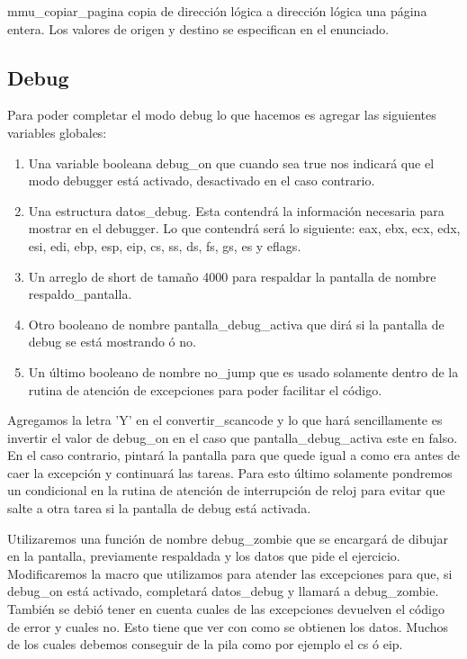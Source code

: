 \documentclass[a4paper]{article}
\begin{document}
mmu\_copiar\_pagina copia de dirección lógica a dirección lógica una página entera. Los valores de origen y destino se especifican en el enunciado.

\subsection{Debug}

Para poder completar el modo debug lo que hacemos es agregar las siguientes variables globales:
\begin{enumerate}
  \item Una variable booleana debug\_on que cuando sea true nos indicará que el modo debugger está activado, desactivado en el caso contrario.
  \item Una estructura datos\_debug. Esta contendrá la información necesaria para mostrar en el debugger. Lo que contendrá será lo siguiente: eax, ebx, ecx, edx, esi, edi, ebp, esp, eip, cs, ss, ds, fs, gs, es y eflags.
  \item Un arreglo de short de tamaño 4000 para respaldar la pantalla de nombre respaldo\_pantalla.
  \item Otro booleano de nombre pantalla\_debug\_activa que dirá si la pantalla de debug se está mostrando ó no.
  \item Un último booleano de nombre no\_jump que es usado solamente dentro de la rutina de atención de excepciones para poder facilitar el código.
\end{enumerate}

Agregamos la letra 'Y' en el convertir\_scancode y lo que hará sencillamente es invertir el valor de debug\_on en el caso que pantalla\_debug\_activa este en falso. En el caso contrario, pintará la pantalla para que quede igual a como era antes de caer la excepción y continuará las tareas. Para esto último solamente pondremos un condicional en la rutina de atención de interrupción de reloj para evitar que salte a otra tarea si la pantalla de debug está activada. 

Utilizaremos una función de nombre debug\_zombie que se encargará de dibujar en la pantalla, previamente respaldada y los datos que pide el ejercicio. Modificaremos la macro que utilizamos para atender las excepciones para que, si debug\_on está activado, completará datos\_debug y llamará a debug\_zombie. También se debió tener en cuenta cuales de las excepciones devuelven el código de error y cuales no. Esto tiene que ver con como se obtienen los datos. Muchos de los cuales debemos conseguir de la pila como por ejemplo el cs ó eip. 
\end{document}
